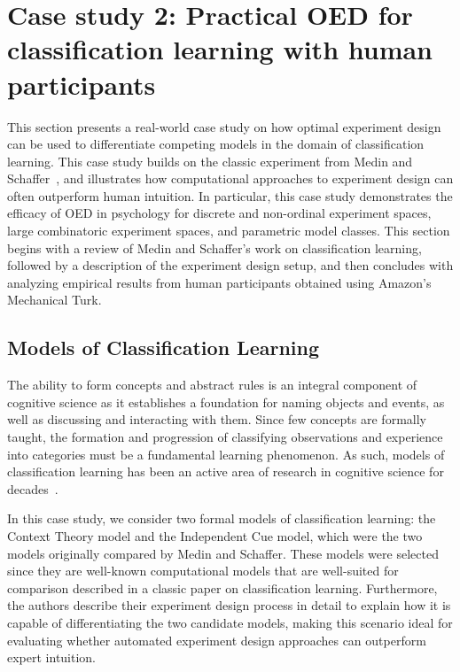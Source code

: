 \documentclass[11pt]{article}
\begin{document}
\section{Case study 2: Practical OED for classification learning with human participants}
\label{s:ms}

This section presents a real-world case study on how optimal experiment design can be used to differentiate competing models in the domain of classification learning. This case study builds on the classic experiment from Medin and Schaffer~\cite{medin78:pr}, and illustrates how computational approaches to experiment design can often outperform human intuition. In particular, this case study demonstrates the efficacy of OED in psychology for discrete and non-ordinal experiment spaces, large combinatoric experiment spaces, and parametric model classes. This section begins with a review of Medin and Schaffer's work on classification learning, followed by a description of the experiment design setup, and then concludes with analyzing empirical results from human participants obtained using Amazon's Mechanical Turk. 

\subsection{Models of Classification Learning}
The ability to form concepts and abstract rules is an integral component of cognitive science as it establishes a foundation for naming objects and events, as well as discussing and interacting with them. Since few concepts are formally taught, the formation and progression of classifying observations and experience into categories must be a fundamental learning phenomenon. As such, models of classification learning has been an active area of research in cognitive science for decades~\cite{machery10:bbs}. 

In this case study, we consider two formal models of classification learning: the Context Theory model and the Independent Cue model, which were the two models originally compared by Medin and Schaffer. These models were selected since they are well-known computational models that are well-suited for comparison described in a classic paper on classification learning. Furthermore, the authors describe their experiment design process in detail to explain how it is capable of differentiating the two candidate models, making this scenario ideal for evaluating whether automated experiment design approaches can outperform expert intuition. 
\end{document}
